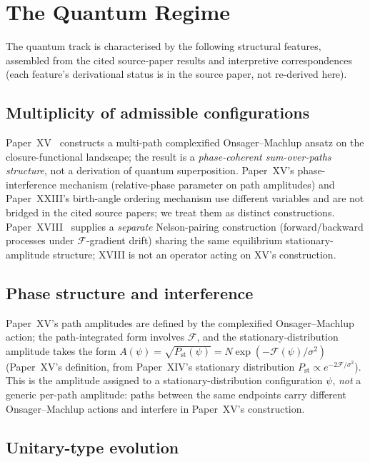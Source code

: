 \documentclass[12pt]{article}
\newcommand{\Fcal}{\mathcal{F}}
\begin{document}
\section{The Quantum Regime}\label{sec:quantum}

The quantum track is characterised by the following structural features, assembled from the cited source-paper results and interpretive correspondences (each feature's derivational status is in the source paper, not re-derived here).

\subsection{Multiplicity of admissible configurations}

Paper~XV~\citep{SmartXV} constructs a multi-path complexified Onsager--Machlup ansatz on the closure-functional landscape; the result is a \emph{phase-coherent sum-over-paths structure}, not a derivation of quantum superposition. Paper~XV's phase-interference mechanism (relative-phase parameter on path amplitudes) and Paper~XXIII's birth-angle ordering mechanism use different variables and are not bridged in the cited source papers; we treat them as distinct constructions. Paper~XVIII~\citep{SmartXVIII} supplies a \emph{separate} Nelson-pairing construction (forward/backward processes under $\Fcal$-gradient drift) sharing the same equilibrium stationary-amplitude structure; XVIII is not an operator acting on XV's construction.

\subsection{Phase structure and interference}

Paper~XV's path amplitudes are defined by the complexified Onsager--Machlup action; the path-integrated form involves $\Fcal$, and the stationary-distribution amplitude takes the form $A(\psi) = \sqrt{P_{\mathrm{st}}(\psi)} = N \exp(-\Fcal(\psi)/\sigma^2)$ (Paper~XV's definition, from Paper~XIV's stationary distribution $P_{\mathrm{st}} \propto e^{-2\Fcal/\sigma^2}$). This is the amplitude assigned to a stationary-distribution configuration $\psi$, \emph{not} a generic per-path amplitude: paths between the same endpoints carry different Onsager--Machlup actions and interfere in Paper~XV's construction.

\subsection{Unitary-type evolution}
\end{document}
